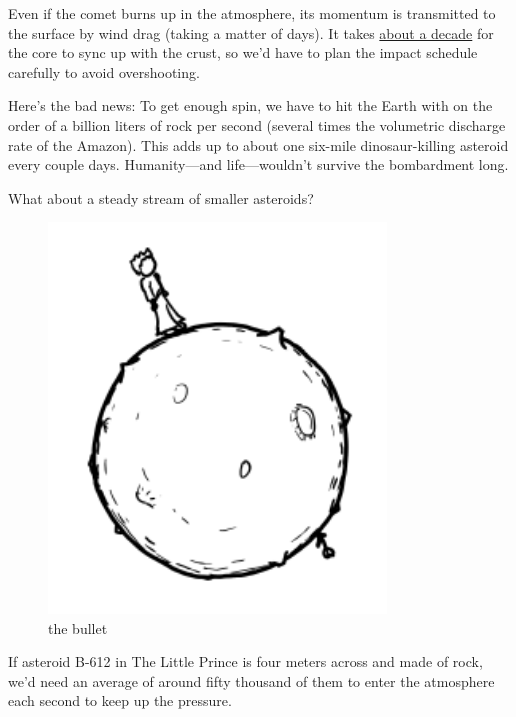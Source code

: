 {Even if the comet burns up in the atmosphere, its momentum is transmitted to the surface by wind drag (taking a matter of days). It takes \href{http://www.researchgate.net/publication/227650235\_Topographic\_CoreMantle\_Coupling\_and\_Polar\_Motion\_On\_Decadal\_TimeScales}{about a decade} for the core to sync up with the crust, so we’d have to plan the impact schedule carefully to avoid overshooting.}

{Here’s the bad news: To get enough spin, we have to hit the Earth with on the order of a billion liters of rock per second (several times the volumetric discharge rate of the Amazon). This adds up to about one six-mile dinosaur-killing asteroid every couple days. Humanity—and life—wouldn’t survive the bombardment long.}

{What about a steady stream of smaller asteroids?}

\begin{figure}[!htbp]
\centering
\includegraphics[scale=0.5, max width=0.8\textwidth]{imgs/a/26/leap_prince.png}
\caption{the bullet}
\end{figure}

{If asteroid B-612 in The Little Prince is four meters across and made of rock, we’d need an average of around fifty thousand of them to enter the atmosphere each second to keep up the pressure.}

